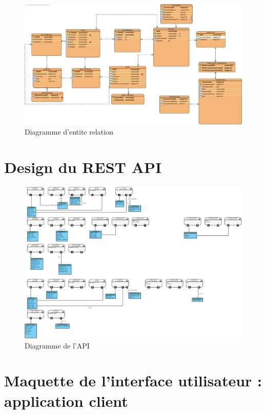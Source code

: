 \documentclass[]{report}
\begin{document}
\begin{figure}[h]
	\centering\includegraphics[width=\linewidth]{img/BDD.pdf}
	\caption{Diagramme d'entite relation}
\end{figure}


\newpage


\section{Design du REST API}

\begin{figure}[h]
	\centering\includegraphics[width=\linewidth]{img/rest-api-commun.pdf}
	\caption{Diagramme de l'API}
\end{figure}




\newpage


\section{Maquette de l'interface utilisateur : application client}
\end{document}
